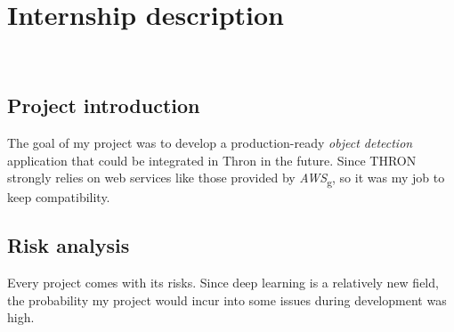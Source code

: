 
\chapter{Internship description}
\label{cap:internship}

\\

\section{Project introduction}
The goal of my project was to develop a production-ready \emph{object detection} application that could be integrated in Thron in the future. Since THRON strongly relies on web services like those provided by \emph{\gls{AWS}}\textsubscript{g}, so it was my job to keep compatibility.
\section{Risk analysis}

Every project comes with its risks. Since deep learning is a relatively new field, the probability my project would incur into some issues during development was high.\\

